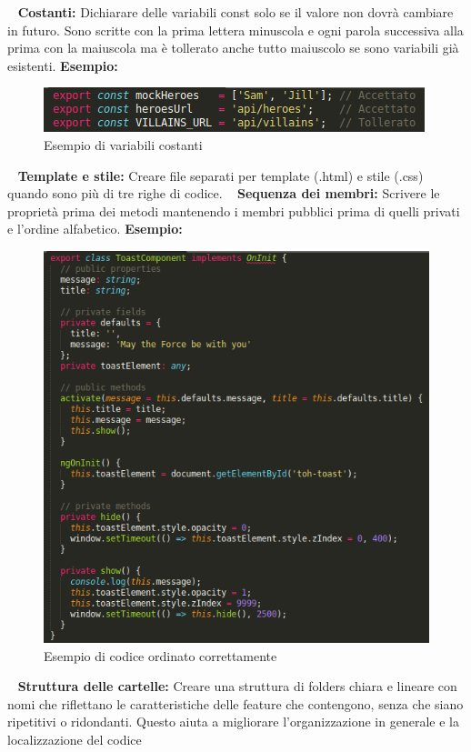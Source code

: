 	~\newline
	\textbf{Costanti:} Dichiarare delle variabili const solo se il valore non dovrà cambiare in futuro. Sono scritte con la prima lettera minuscola e ogni parola successiva alla prima con la maiuscola ma è tollerato anche tutto maiuscolo se sono variabili già esistenti.\newline
	\textbf{Esempio:}
	\begin{figure}[!htbp]
		\centering
		\includegraphics{constAngular.png}
		\caption{Esempio di variabili costanti}
	\end{figure}
	~\newline
	\textbf{Template e stile:} Creare file separati per template (.html) e stile (.css) quando sono più di tre righe di codice.
	\clearpage
	~\newline
	\textbf{Sequenza dei membri:} Scrivere le proprietà prima dei metodi mantenendo i membri pubblici prima di quelli privati e l'ordine alfabetico.\newline
	\textbf{Esempio:}
	\begin{figure}[!htbp]
		\centering
		\includegraphics{sequenzaAngular.png}
		\caption{Esempio di codice ordinato correttamente}
	\end{figure}
	\clearpage
	~\newline
	\textbf{Struttura delle cartelle:} Creare una struttura di folders chiara e lineare con nomi che riflettano le caratteristiche delle feature che contengono, senza che siano ripetitivi o ridondanti. Questo aiuta a migliorare l'organizzazione in generale e la localizzazione del codice
